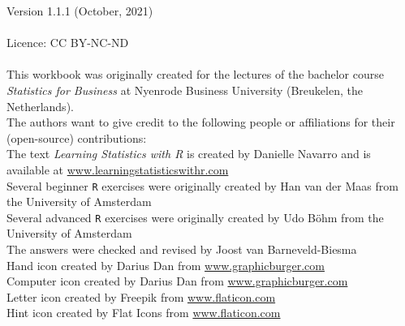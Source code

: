 \thispagestyle{emptyhead}

\vspace*{\fill} 

{\fontsize{8}{10}\selectfont

Version 1.1.1 (October, 2021) \\
\\
Licence: CC BY-NC-ND \\
\\
This workbook was originally created for the lectures of the bachelor course \textit{Statistics for Business} at Nyenrode Business University (Breukelen, the Netherlands). \\

The authors want to give credit to the following people or affiliations for their (open-source) contributions: \\

The text \textit{Learning Statistics with R} is created by Danielle Navarro and is available at \url{www.learningstatisticswithr.com} \\
Several beginner \texttt{R} exercises were originally created by Han van der Maas from the University of Amsterdam \\
Several advanced \texttt{R} exercises were originally created by Udo B{\"o}hm from the University of Amsterdam \\
The answers were checked and revised by Joost van Barneveld-Biesma \\
Hand icon created by Darius Dan from \url{www.graphicburger.com} \\
Computer icon created by Darius Dan from \url{www.graphicburger.com} \\
Letter icon created by Freepik from \url{www.flaticon.com} \\
Hint icon created by Flat Icons from \url{www.flaticon.com}

}

\clearpage %
